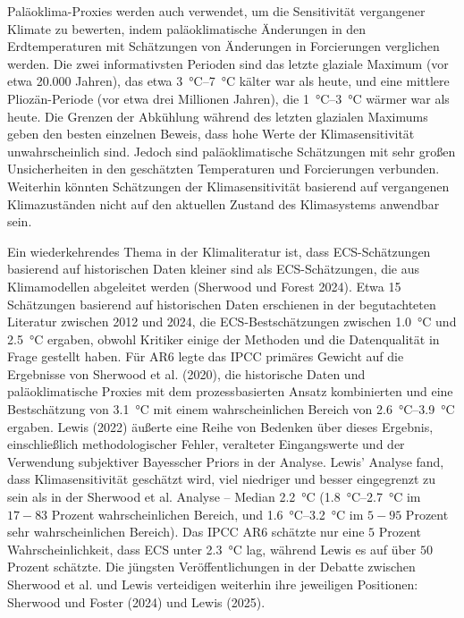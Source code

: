 \documentclass[12pt,paper=a4,DIV=12,parskip=never,chapterprefix=false,headings=standardclasses]{scrreprt}
\begin{document}
Paläoklima-Proxies werden auch verwendet, um die Sensitivität vergangener Klimate zu bewerten, indem paläoklimatische Änderungen in den Erdtemperaturen mit Schätzungen von Änderungen in Forcierungen verglichen werden. Die zwei informativsten Perioden sind das letzte glaziale Maximum (vor etwa 20.000 Jahren), das etwa \SIrange{3}{7}{\celsius} kälter war als heute, und eine mittlere Pliozän-Periode (vor etwa drei Millionen Jahren), die \SIrange{1}{3}{\celsius} wärmer war als heute. Die Grenzen der Abkühlung während des letzten glazialen Maximums geben den besten einzelnen Beweis, dass hohe Werte der Klimasensitivität unwahrscheinlich sind. Jedoch sind paläoklimatische Schätzungen mit sehr großen Unsicherheiten in den geschätzten Temperaturen und Forcierungen verbunden. Weiterhin könnten Schätzungen der Klimasensitivität basierend auf vergangenen Klimazuständen nicht auf den aktuellen Zustand des Klimasystems anwendbar sein.

Ein wiederkehrendes Thema in der Klimaliteratur ist, dass ECS-Schätzungen basierend auf historischen Daten kleiner sind als ECS-Schätzungen, die aus Klimamodellen abgeleitet werden (Sherwood und Forest 2024). Etwa 15 Schätzungen basierend auf historischen Daten erschienen in der begutachteten Literatur zwischen 2012 und 2024, die ECS-Bestschätzungen zwischen \SI{1.0}{\celsius} und \SI{2.5}{\celsius} ergaben, obwohl Kritiker einige der Methoden und die Datenqualität in Frage gestellt haben. Für AR6 legte das IPCC primäres Gewicht auf die Ergebnisse von Sherwood et al. (2020), die historische Daten und paläoklimatische Proxies mit dem prozessbasierten Ansatz kombinierten und eine Bestschätzung von \SI{3.1}{\celsius} mit einem wahrscheinlichen Bereich von \SIrange{2.6}{3.9}{\celsius} ergaben. Lewis (2022) äußerte eine Reihe von Bedenken über dieses Ergebnis, einschließlich methodologischer Fehler, veralteter Eingangswerte und der Verwendung subjektiver Bayesscher Priors in der Analyse. Lewis' Analyse fand, dass Klimasensitivität geschätzt wird, viel niedriger und besser eingegrenzt zu sein als in der Sherwood et al. Analyse – Median \SI{2.2}{\celsius} (\SIrange{1.8}{2.7}{\celsius} im $17-83$ Prozent wahrscheinlichen Bereich, und \SIrange{1.6}{3.2}{\celsius} im $5-95$ Prozent sehr wahrscheinlichen Bereich). Das IPCC AR6 schätzte nur eine $5$ Prozent Wahrscheinlichkeit, dass ECS unter \SI{2.3}{\celsius} lag, während Lewis es auf über $50$ Prozent schätzte. Die jüngsten Veröffentlichungen in der Debatte zwischen Sherwood et al. und Lewis verteidigen weiterhin ihre jeweiligen Positionen: Sherwood und Foster (2024) und Lewis (2025).
\end{document}
